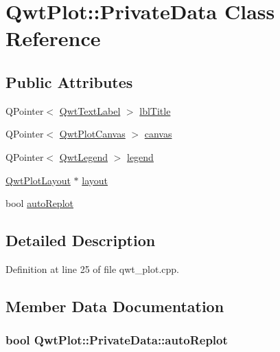 \hypertarget{class_qwt_plot_1_1_private_data}{\section{Qwt\-Plot\-:\-:Private\-Data Class Reference}
\label{class_qwt_plot_1_1_private_data}
}
\subsection*{Public Attributes}
\begin{DoxyCompactItemize}
\item 
Q\-Pointer$<$ \hyperlink{class_qwt_text_label}{Qwt\-Text\-Label} $>$ \hyperlink{class_qwt_plot_1_1_private_data_a0694a424d36caf341c4a2095e9fe137b}{lbl\-Title}
\item 
Q\-Pointer$<$ \hyperlink{class_qwt_plot_canvas}{Qwt\-Plot\-Canvas} $>$ \hyperlink{class_qwt_plot_1_1_private_data_ab64ee9b853c86d7be2b6da8342e95e00}{canvas}
\item 
Q\-Pointer$<$ \hyperlink{class_qwt_legend}{Qwt\-Legend} $>$ \hyperlink{class_qwt_plot_1_1_private_data_a301a5243bda218bace525cfa7e8c6195}{legend}
\item 
\hyperlink{class_qwt_plot_layout}{Qwt\-Plot\-Layout} $\ast$ \hyperlink{class_qwt_plot_1_1_private_data_a457da2247f4c47e25f9b172992a5468f}{layout}
\item 
bool \hyperlink{class_qwt_plot_1_1_private_data_a69521ec9fb4a9a9bb8596103958d05b5}{auto\-Replot}
\end{DoxyCompactItemize}


\subsection{Detailed Description}


Definition at line 25 of file qwt\-\_\-plot.\-cpp.



\subsection{Member Data Documentation}
\hypertarget{class_qwt_plot_1_1_private_data_a69521ec9fb4a9a9bb8596103958d05b5}{
\subsubsection[{auto\-Replot}]{\setlength{\rightskip}{0pt plus 5cm}bool Qwt\-Plot\-::\-Private\-Data\-::auto\-Replot}}\label{class_qwt_plot_1_1_private_data_a69521ec9fb4a9a9bb8596103958d05b5}


